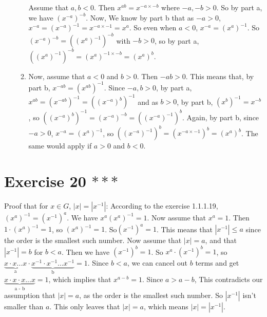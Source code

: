 \documentclass[12pt]{article}
\begin{document}
\begin{enumerate}[label=\textbf{\alph*.}]
\begin{enumerate}[label=\textbf{case \arabic*:}]
                    Assume that $a, b < 0$.
                    Then $x^{ab} = x^{-a \times -b}$
                    where $-a, -b > 0$.
                    So by part a, we have $(x^{-a})^{-b}$.
                    Now, We know by part b that as $-a > 0$, $x^{-a}
                    = (x^{-a})^{-1} = x^{-a \times -1}
                    = x^{a}$.
                    So even when $a < 0$, $x^{-a} = (x^{a})^{-1}$. 
                    So $(x^{-a})^{-b} = ((x^{a})^{-1})^{-b}$ with $-b > 0$,
                    so by part a, $((x^{a})^{-1})^{-b}
                    = (x^{a})^{-1 \times -b}
                    = (x^{a})^{b}$.
                \item
                    Now, assume that $a < 0$ and $b > 0$.
                    Then $-ab > 0$.
                    This means that, by part b, $x^{-ab} = (x^{ab})^{-1}$.
                    Since $-a, b > 0$, by part a, $x^{ab}
                    = (x^{-ab})^{-1}
                    = ((x^{-a})^{b})^{-1}$
                    and as $b > 0$, by part b, $(x^{b})^{-1} = x^{-b}$,
                    so $((x^{-a})^{b})^{-1}
                    = (x^{-a})^{-b}
                    = ((x^{-a})^{-1})^{b}$.
                    Again, by part b, since $-a > 0$, $x^{-a} = (x^{a})^{-1}$,
                    so $((x^{-a})^{-1})^{b}
                    = (x^{-a \times -1})^{b}
                    = (x^{a})^{b}$.
                    The same would apply if $a > 0$ and $b < 0$.
                \end{enumerate}
    \end{enumerate}


    \section*{Exercise 20 $***$}
    Proof that for $x \in G$, $|x| = |x^{-1}|$:
    According to the exercise 1.1.1.19, $(x^{a})^{-1} = (x^{-1})^{a}$.
    We have $x^{a}(x^{a})^{-1} = 1$.
    Now assume that $x^a = 1$.
    Then $1 \cdot (x^{a})^{-1} = 1$, so $(x^{a})^{-1} = 1$.
    So$(x^{-1})^{a} = 1$.
    This means that $|x^{-1}| \leqslant a$
    since the order is the smallest such number.
    Now assume that $|x| = a$, and that $|x^{-1}| = b$ for $b < a$.
    Then we have $(x^{-1})^{b} = 1$.
    So $x^{a} \cdot (x^{-1})^{b} = 1$,
    so $\underbrace{x \cdot x ... x}_\text{a} \cdot
    \underbrace{x^{-1} \cdot x^{-1} ... x^{-1}}_\text{b} = 1$.
    Since $b < a$, we can cancel out $b$ terms and get
    $\underbrace{x \cdot x \cdot x ... x}_\text{a - b} = 1$,
    which implies that $x^{a-b} = 1$.
    Since $a > a - b$, This contradicts our assumption that $|x| = a$,
    as the order is the smallest such number.
    So $|x^{-1}|$ isn't smaller than $a$.
    This only leaves that $|x| = a$,
    which means $|x| = |x^{-1}|$.
\end{document}

